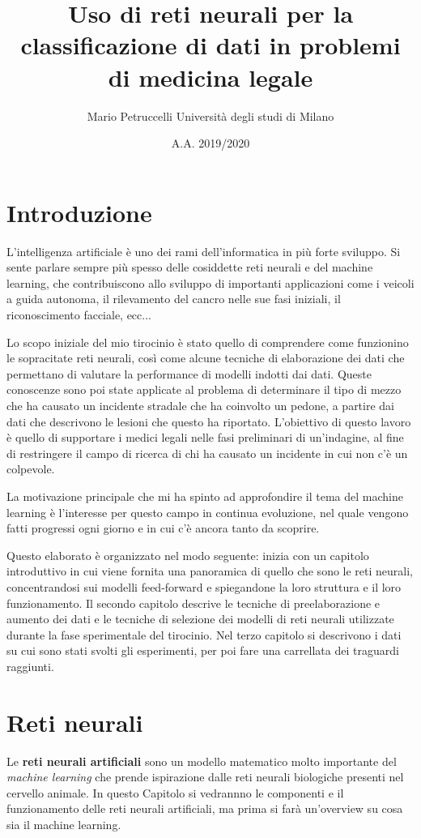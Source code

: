 \documentclass[12pt, twoside, letterpaper]{report}
\title{Uso di reti neurali per la classificazione di dati in problemi di medicina legale}
\author{Mario Petruccelli \cr Università degli studi di Milano}
\date{A.A. 2019/2020}
\begin{document}
	\begin{titlepage}
		
		\newpage
		\tableofcontents
		\thispagestyle{empty}
	\end{titlepage}

	\chapter*{Introduzione}     
		L'intelligenza artificiale è uno dei rami dell'informatica in più forte sviluppo. Si sente parlare sempre più spesso delle cosiddette reti neurali e del machine learning, che contribuiscono allo sviluppo di importanti applicazioni come i veicoli a guida autonoma, il rilevamento del cancro nelle sue fasi iniziali, il riconoscimento facciale, ecc... 

		Lo scopo iniziale del mio tirocinio è stato quello di comprendere come funzionino le sopracitate reti neurali, così come alcune tecniche di elaborazione dei dati che permettano di valutare la performance di modelli indotti dai dati. Queste conoscenze sono poi state applicate al problema di determinare il tipo di mezzo che ha causato un incidente stradale che ha coinvolto un pedone, a partire dai dati che descrivono le lesioni che questo ha riportato. L'obiettivo di questo lavoro è quello di supportare i medici legali nelle fasi preliminari di un'indagine, al fine di restringere il campo di ricerca di chi ha causato un incidente in cui non c'è un colpevole. 

		La motivazione principale che mi ha spinto ad approfondire il tema del machine learning è l'interesse per questo campo in continua evoluzione, nel quale vengono fatti progressi ogni giorno e in cui c'è ancora tanto da scoprire.

		Questo elaborato è organizzato nel modo seguente: inizia con un capitolo introduttivo in cui viene fornita una panoramica di quello che sono le reti neurali, concentrandosi sui modelli feed-forward e spiegandone la loro struttura e il loro funzionamento. Il secondo capitolo descrive le tecniche di preelaborazione e aumento dei dati e le tecniche di selezione dei modelli di reti neurali utilizzate durante la fase sperimentale del tirocinio. Nel terzo capitolo si descrivono i dati su cui sono stati svolti gli esperimenti, per poi fare una carrellata dei traguardi raggiunti. 

		\newpage		
	\chapter{Reti neurali}
		Le \textbf{reti neurali artificiali} sono un modello matematico molto importante del \textit{machine learning} che prende ispirazione dalle reti neurali biologiche presenti nel cervello animale. In questo Capitolo si vedrannno le componenti e il funzionamento delle reti neurali artificiali, ma prima si farà un'overview su cosa sia il machine learning.
\end{document}

